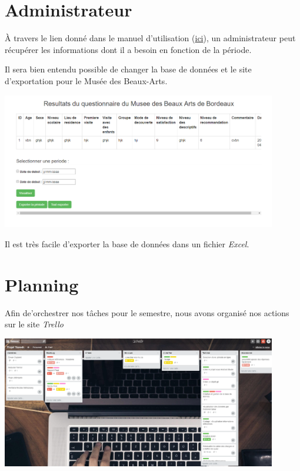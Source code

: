 \documentclass[12]{report}
\begin{document}
  \section{Administrateur}

  À travers le lien donné dans le manuel d'utilisation (\href{http://sullyvan.tremor.emi.u-bordeaux.fr/script_php/DB_online.php}{ici}), un administrateur peut récupérer
  les informations dont il a besoin en fonction de la période.

  Il sera bien entendu possible de changer la base de données et le site d'exportation pour le Musée des Beaux-Arts.

  \begin{center}
  \includegraphics[width=12cm]{bdd.png}
  \end{center}

  Il est très facile d'exporter la base de données dans un fichier \emph{Excel}.


  \section{Planning}

  Afin de'orchestrer nos tâches pour le semestre, nous avons organisé nos actions sur le site \emph{Trello}

  \begin{center}
  \includegraphics[width=12cm]{trello.png}
  \end{center}
\end{document}
